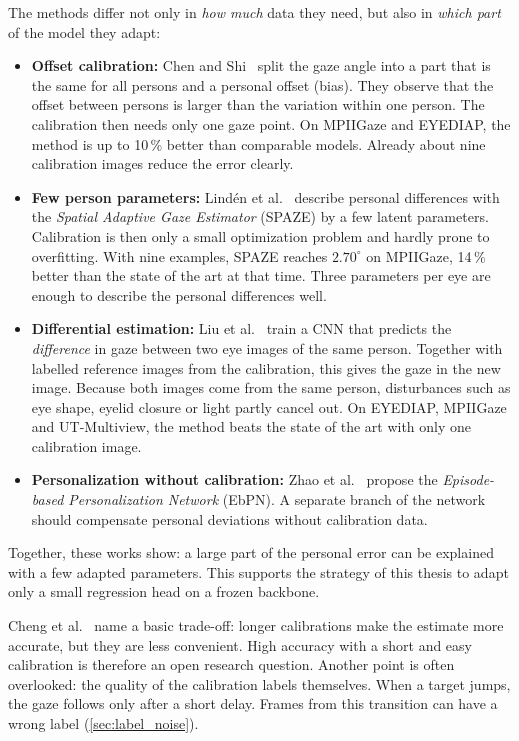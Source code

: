 The methods differ not only in \emph{how much} data they need, but also in
\emph{which part} of the model they adapt:
\begin{itemize}
  \item \textbf{Offset calibration:} Chen and Shi~\cite{chen2020offset} split
        the gaze angle into a part that is the same for all persons and a
        personal offset (bias). They observe that the offset between persons is
        larger than the variation within one person. The calibration then
        needs only one gaze point. On MPIIGaze and EYEDIAP, the method is up to
        10\,\% better than comparable models. Already about nine calibration
        images reduce the error clearly.
  \item \textbf{Few person parameters:} Lindén et al.~\cite{linden2019spaze}
        describe personal differences with the \emph{Spatial Adaptive Gaze
        Estimator} (SPAZE) by a few latent parameters. Calibration is then only
        a small optimization problem and hardly prone to overfitting. With nine
        examples, SPAZE reaches $2.70^\circ$ on MPIIGaze, 14\,\% better than
        the state of the art at that time. Three parameters per eye are enough
        to describe the personal differences well.
  \item \textbf{Differential estimation:} Liu et
        al.~\cite{liu2021differential} train a CNN that predicts the
        \emph{difference} in gaze between two eye images of the same person.
        Together with labelled reference images from the calibration, this
        gives the gaze in the new image. Because both images come from the same
        person, disturbances such as eye shape, eyelid closure or light partly
        cancel out. On EYEDIAP, MPIIGaze and UT-Multiview, the method beats the
        state of the art with only one calibration image.
  \item \textbf{Personalization without calibration:} Zhao et
        al.~\cite{zhao2022ebpn} propose the \emph{Episode-based Personalization
        Network} (EbPN). A separate branch of the network should compensate
        personal deviations without calibration data.
\end{itemize}
Together, these works show: a large part of the personal error can be explained
with a few adapted parameters. This supports the strategy of this thesis to
adapt only a small regression head on a frozen backbone.

Cheng et al.~\cite{cheng2024review} name a basic trade-off: longer
calibrations make the estimate more accurate, but they are less convenient.
High accuracy with a short and easy calibration is therefore an open research
question. Another point is often overlooked: the quality of the calibration
labels themselves. When a target jumps, the gaze follows only after a short
delay. Frames from this transition can have a wrong label
(\cref{sec:label_noise}).

